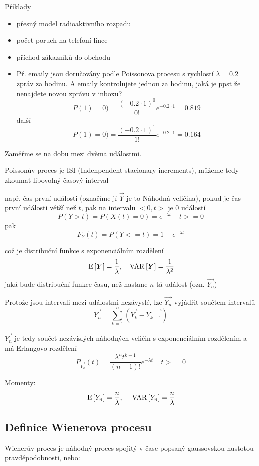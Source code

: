 Příklady
\begin{itemize}
	\item přesný model radioaktivního rozpadu
	\item počet poruch na telefoní lince
	\item příchod zákazníků do obchodu
	\item Př. emaily jsou doručovány podle Poissonova procesu s rychlostí $\lambda = 0.2$ zpráv za hodinu. A emaily kontrolujete jednou za hodinu, jaká je ppst že nenajdete novou zprávu v inboxu? \[ P(1) = 0) = \dfrac{(-0.2 \cdot 1 )^0}{0!} e^{-0.2 \cdot 1} = 0.819 \] další \[ P(1) = 0) = \dfrac{(-0.2 \cdot 1 )^1}{1!} e^{-0.2 \cdot 1} = 0.164 \]
\end{itemize}

Zaměřme se na dobu mezi dvěma událostmi.

Poissonův proces je ISI (Indenpendent stacionary increments), můžeme tedy zkoumat libovolný časový interval

např. čas první události (označíme jí $\vec{Y}$ je to Náhodná veličina), pokud je čas první události větší než $t$, pak na intervalu $<0,t>$ je 0 událostí \[ P(Y>t) = P(X(t) = 0) = e^{-\lambda t} \;\;\;\; t >= 0 \]
pak \[ F_Y(t) = P(Y <= t ) = 1 - e^{-\lambda t} \]

což je  distribuční funkce s exponenciálním rozdělení \[ \,\mathrm{E}\left[\boldsymbol{Y}\right] = \frac{1}{\lambda}, \;\;\; \,\mathrm{VAR}\left[\boldsymbol{Y}\right] = \frac{1}{\lambda^2} \]
jaká bude distribuční funkce času, než nastane $n$-tá událost (ozn. $\vec{Y_n}$)

Protože jsou intervali mezi událostmi nezávyslé, lze $\vec{Y_n}$ vyjádřit  součtem intervalů \[ \vec{Y_n} = \sum_{k=1}^n (\vec{Y_k} -\vec{Y_{k-1}}) \]

$\vec{Y_n}$ je tedy součet nezávislých náhodných veličin s exponenciálním rozdělením a má Erlangovo rozdělení \[ P_{\vec{Y_k}} (t) = \dfrac{\lambda^n t^{k-1}}{(n-1)!} e^{-\lambda t} \;\;\;\; t >= 0 \]

Momenty: \[ \,\mathrm{E}\left[Y_n\right] = \frac{n}{\lambda},  \;\;\;\; \,\mathrm{VAR}\left[Y_n\right] = \frac{n}{\lambda}  \]




\subsection{Definice Wienerova procesu}
Wienerův proces je náhodný proces spojitý v čase popsaný gaussovskou hustotou pravděpodobnosti, nebo:


